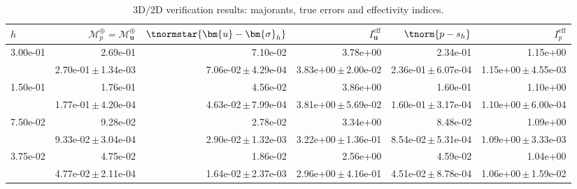 \begin{table}
\centering
\caption{3D/2D verification results: majorants, true errors and effectivity indices.}
\label{tab:verification_majorant}
\begin{tabular}{lrrrrr}
\toprule
$h$ & $\mathcal{M}^\oplus_p=\mathcal{M}^\oplus_{\bm{u}}$ & $\tnormstar{\bm{u} - \bm{\sigma}_h}$ & $I_{\bm{u}}^{\mathrm{eff}}$ & $\tnorm{p - s_h}$ & $I_p^{\mathrm{eff}}$ \\
\midrule
\multirow{2}{*}{3.00e-01} & 2.69e-01 & 7.10e-02 & 3.78e+00 & 2.34e-01 & 1.15e+00 \\
 & 2.70e-01\,$\pm$\,1.34e-03 & 7.06e-02\,$\pm$\,4.29e-04 & 3.83e+00\,$\pm$\,2.00e-02 & 2.36e-01\,$\pm$\,6.07e-04 & 1.15e+00\,$\pm$\,4.55e-03 \\
\midrule
\multirow{2}{*}{1.50e-01} & 1.76e-01 & 4.56e-02 & 3.86e+00 & 1.60e-01 & 1.10e+00 \\
 & 1.77e-01\,$\pm$\,4.20e-04 & 4.63e-02\,$\pm$\,7.99e-04 & 3.81e+00\,$\pm$\,5.69e-02 & 1.60e-01\,$\pm$\,3.17e-04 & 1.10e+00\,$\pm$\,6.00e-04 \\
\midrule
\multirow{2}{*}{7.50e-02} & 9.28e-02 & 2.78e-02 & 3.34e+00 & 8.48e-02 & 1.09e+00 \\
 & 9.33e-02\,$\pm$\,3.04e-04 & 2.90e-02\,$\pm$\,1.32e-03 & 3.22e+00\,$\pm$\,1.36e-01 & 8.54e-02\,$\pm$\,5.31e-04 & 1.09e+00\,$\pm$\,3.33e-03 \\
\midrule
\multirow{2}{*}{3.75e-02} & 4.75e-02 & 1.86e-02 & 2.56e+00 & 4.59e-02 & 1.04e+00 \\
 & 4.77e-02\,$\pm$\,2.11e-04 & 1.64e-02\,$\pm$\,2.37e-03 & 2.96e+00\,$\pm$\,4.16e-01 & 4.51e-02\,$\pm$\,8.78e-04 & 1.06e+00\,$\pm$\,1.59e-02 \\
\bottomrule
\end{tabular}
\end{table}
